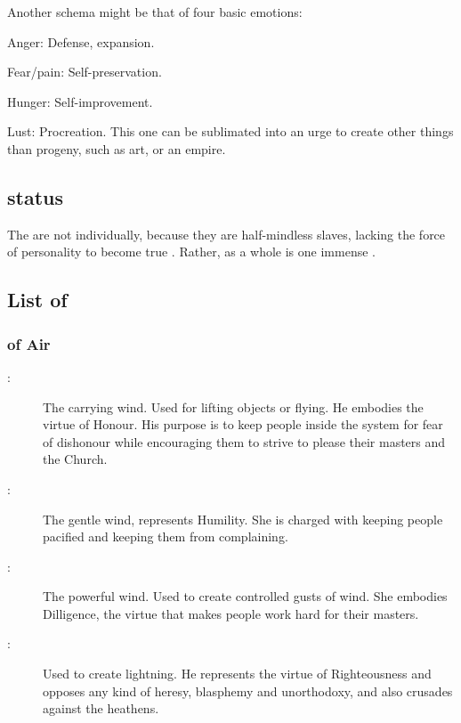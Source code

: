 Another schema might be that of four basic emotions:

\begin{description}
  \item Anger: Defense, expansion.
  \item Fear/pain: Self-preservation.
  \item Hunger: Self-improvement.
  \item Lust: Procreation. This one can be sublimated into an urge to create other things than progeny, such as art, or an empire.
\end{description}








\subsection{\Vertex{} status}
The \Sephiroth{} are not \vertices{} individually, because they are half-mindless slaves, lacking the force of personality to become true \vertices. Rather, \iquin{} as a whole is one immense \vertex{}. 









\subsection{List of \Sephiroth}
\newenvironment{sephlist}{\begin{description}}{\end{description}}
\newcommand{\seph}[1]{\item[#1:]}



\subsubsection{\Sephiroth{} of Air}
\begin{sephlist}
  \seph{\Atzirah{}}
    The carrying wind. Used for lifting objects or flying. He embodies the virtue of Honour. His purpose is to keep people inside the system for fear of dishonour while encouraging them to strive to please their masters and the Church. 
  
  \seph{\Feazirah{}}
    The gentle wind, represents Humility. She is charged with keeping people pacified and keeping them from complaining. 
  
  \seph{\Keshirah{}}
    The powerful wind. Used to create controlled gusts of wind. She embodies Dilligence, the virtue that makes people work hard for their masters. 
  
  \seph{\Razilah{}}
    Used to create lightning. He represents the virtue of Righteousness and opposes any kind of heresy, blasphemy and unorthodoxy, and also crusades against the heathens. 

\end{sephlist}

